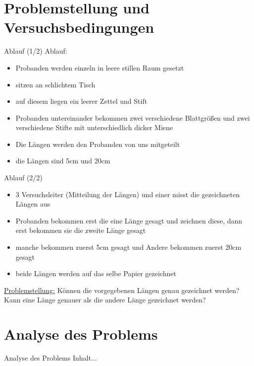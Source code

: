 \documentclass[ ngerman, fontsize= 10pt, headings=big, titlepage=true]{beamer}
\begin{document}
\section{Problemstellung und Versuchsbedingungen}
\begin{frame}{Ablauf (1/2)}
Ablauf:
\begin{itemize}
\item Probanden werden einzeln in leere stillen Raum gesetzt
\item sitzen an schlichtem Tisch 
\item auf diesem liegen ein leerer Zettel und Stift
\item Probanden untereinander bekommen zwei verschiedene Blattgrößen und zwei verschiedene Stifte mit unterschiedlich dicker Miene
\item Die Längen werden den Probanden von uns mitgeteilt
\item die Längen sind 5cm und 20cm




\end{itemize}
	
\end{frame}
\begin{frame}{Ablauf (2/2)}
\begin{itemize}

\item 3 Versuchsleiter (Mitteilung der Längen) und einer misst die gezeichneten Längen aus
\item Probanden bekommen erst die eine Länge gesagt und zeichnen diese, dann erst bekommen sie die zweite Länge gesagt
\item manche bekommen zuerst 5cm gesagt und Andere bekommen zuerst 20cm gesagt
\item beide Längen werden auf das selbe Papier gezeichnet 
\end{itemize}
\underline{Problemstellung:}\newline
Können die vorgegebenen Längen genau gezeichnet werden? \newline
Kann eine Länge genauer als die andere Länge gezeichnet werden?

\end{frame}

\section{Analyse des Problems}
\begin{frame}{Analyse des Problems}
	Inhalt...
\end{frame}
\end{document}

